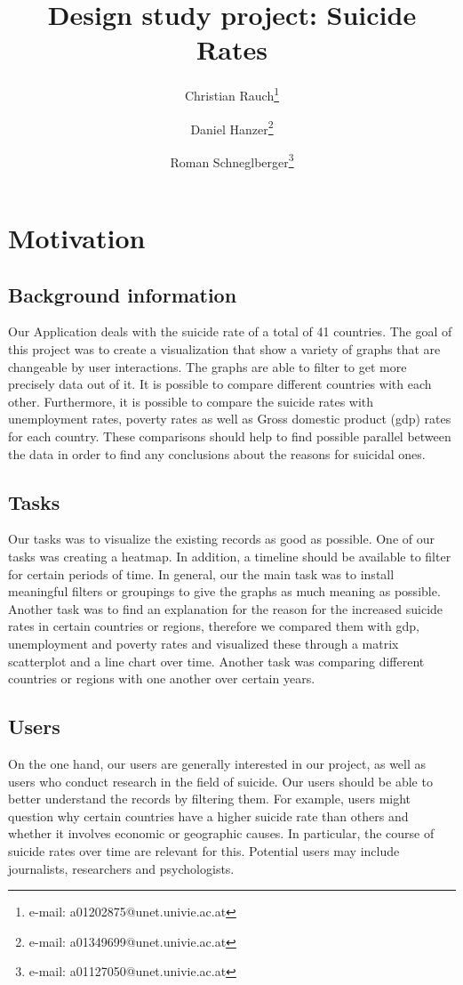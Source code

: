 \documentclass{vgtc}                          %
\title{Design study project: Suicide Rates}
\author{Christian Rauch\thanks{e-mail: a01202875@unet.univie.ac.at} %
\and Daniel Hanzer\thanks{e-mail: a01349699@unet.univie.ac.at} %
\and Roman Schneglberger\thanks{e-mail: a01127050@unet.univie.ac.at}}
\affiliation{\scriptsize University of Vienna \\ Faculty of Computer Science}
\begin{document}
\maketitle

\section{Motivation}

\subsection{Background information}

Our Application deals with the suicide rate of a total of 41 countries. The goal of this project was to create a visualization that show a variety of graphs that are changeable by user interactions. The graphs are able to filter to get more precisely data out of it. It is possible to compare different countries with each other. Furthermore, it is possible to compare the suicide rates with unemployment rates, poverty rates as well as Gross domestic product (gdp) rates for each country. These comparisons should help to find possible parallel between the data in order to find any conclusions about the reasons for suicidal ones. 

\subsection{Tasks}

Our tasks was to visualize the existing records as good as possible. One of our tasks was creating a heatmap. In addition, a timeline should be available to filter for certain periods of time. In general, our the main task was to install meaningful filters or groupings to give the graphs as much meaning as possible. Another task was to find an explanation for the reason for the increased suicide rates in certain countries or regions, therefore we compared them with gdp, unemployment and poverty rates and visualized these through a matrix scatterplot and a line chart over time. Another task was comparing different countries or regions with one another over certain years. 

\subsection{Users}

On the one hand, our users are generally interested in our project, as well as users who conduct research in the field of suicide. Our users should be able to better understand the records by filtering them. For example, users might question why certain countries have a higher suicide rate than others and whether it involves economic or geographic causes. In particular, the course of suicide rates over time are relevant for this. Potential users may include journalists, researchers and psychologists.
\end{document}
